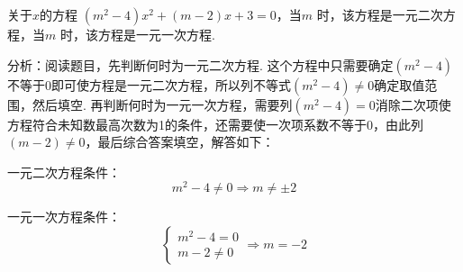 \documentclass[lang=cn, 10pt, titlestyle=display, oneside, toc=twocol]{elegantbook}
\begin{document}
\begin{example}
关于$x$的方程 $(m^2 - 4)x^2 + (m - 2)x + 3 = 0$，当$m$ \underline{\hspace{3.5em}} 时，该方程是一元二次方程，当$m$ \underline{\hspace{3.5em}} 时，该方程是一元一次方程.
\end{example}
\par
\begin{solution}
    分析：阅读题目，先判断何时为一元二次方程. 这个方程中只需要确定$(m^2 - 4)$不等于0即可使方程是一元二次方程，所以列不等式$(m^2 - 4)\ne0$确定取值范围，然后填空. 再判断何时为一元一次方程，需要列$(m^2 - 4)=0$消除二次项使方程符合未知数最高次数为1的条件，还需要使一次项系数不等于0，由此列$(m-2)\ne 0$，最后综合答案填空，解答如下：
    
    一元二次方程条件：
    \[
    m^2 - 4 \neq 0 \Rightarrow m \neq \pm 2
    \]
    
    一元一次方程条件：
    \[
    \begin{cases}
    m^2 - 4 = 0 \\
    m - 2 \neq 0
    \end{cases}
    \Rightarrow m = -2
    \]
\end{solution}
\end{document}
